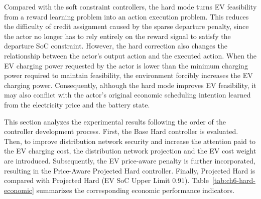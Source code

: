 Compared with the soft constraint controllers, the hard mode turns EV feasibility from a reward learning problem into an action execution problem. This reduces the difficulty of credit assignment caused by the sparse departure penalty, since the actor no longer has to rely entirely on the reward signal to satisfy the departure SoC constraint. However, the hard correction also changes the relationship between the actor's output action and the executed action. When the EV charging power requested by the actor is lower than the minimum charging power required to maintain feasibility, the environment forcibly increases the EV charging power. Consequently, although the hard mode improves EV feasibility, it may also conflict with the actor's original economic scheduling intention learned from the electricity price and the battery state.

This section analyzes the experimental results following the order of the controller development process. First, the Base Hard controller is evaluated. Then, to improve distribution network security and increase the attention paid to the EV charging cost, the distribution network projection and the EV cost weight are introduced. Subsequently, the EV price-aware penalty is further incorporated, resulting in the Price-Aware Projected Hard controller. Finally, Projected Hard is compared with Projected Hard (EV SoC Upper Limit 0.91). Table~\ref{tab:ch6-hard-economic} summarizes the corresponding economic performance indicators.

\begin{table}[htbp]
  \centering
  \caption{Economic Performance Comparison of EV Hard Constraint Controllers and Baseline Methods}
  \label{tab:ch6-hard-economic}
\end{table}

